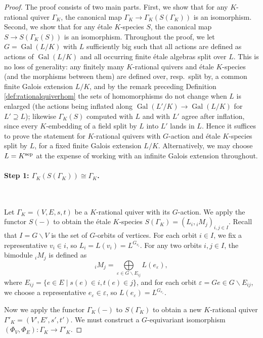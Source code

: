 \documentclass[a4paper,12pt,reqno]{amsart}
\DeclareMathOperator{\Gal}{\mathrm {Gal}}
\theoremstyle{plain}
\theoremstyle{remark}
\begin{document}
  \begin{proof}
    The proof consists of two main parts. First, we show that for any $K$-rational quiver $\Gamma_K$, the canonical map $\Gamma_K \to \Gamma_K(S(\Gamma_K))$ is an isomorphism. Second, we show that for any \'etale $K$-species $S$, the canonical map $S \to S(\Gamma_K(S))$ is an isomorphism. Throughout the proof, we let $G = \Gal(L/K)$ with $L$ sufficiently big such that all actions are defined as actions of $\Gal(L/K)$ and all occurring finite \'etale algebras split over $L$. This is no loss of generality: any finitely many $K$-rational quivers and \'etale $K$-species (and the morphisms between them) are defined over, resp.\ split by, a common finite Galois extension $L/K$, and by the remark preceding Definition \ref{def:rationalquiverhom} the sets of homomorphisms do not change when $L$ is enlarged (the actions being inflated along $\Gal(L'/K)\to\Gal(L/K)$ for $L'\supseteq L$); likewise $\Gamma_K(S)$ computed with $L$ and with $L'$ agree after inflation, since every $K$-embedding of a field split by $L$ into $L'$ lands in $L$. Hence it suffices to prove the statement for $K$-rational quivers with $G$-action and \'etale $K$-species split by $L$, for a fixed finite Galois extension $L/K$. Alternatively, we may choose $L=K^{\rm sep}$ at the expense of working with an infinite Galois extension throughout.

    \paragraph{Step 1: $\Gamma_K(S(\Gamma_K)) \cong \Gamma_K$.}\ 

    \smallskip
    Let $\Gamma_K = (V,E,s,t)$ be a $K$-rational quiver with its $G$-action. We apply the functor $S(-)$ to obtain the \'etale $K$-species $S(\Gamma_K) = (L_i, {}_iM_j)_{i,j \in I}$. Recall that $I=G\backslash V$ is the set of $G$-orbits of vertices. For each orbit $i\in I$, we fix a representative $v_i \in i$, so $L_i=L(v_i)=L^{G_{v_i}}$. For any two orbits $i,j \in I$, the bimodule ${}_iM_j$ is defined as
    \[
      {}_iM_j = \bigoplus\limits_{\varepsilon \in G\backslash E_{ij}} L(e_\varepsilon),
    \]
    where $E_{ij}=\{e\in E \mid s(e)\in i, t(e)\in j\}$, and for each orbit $\varepsilon=Ge \in G\backslash E_{ij}$, we choose a representative $e_\varepsilon \in \varepsilon$, so $L(e_\varepsilon) = L^{G_{e_\varepsilon}}$.

    Now we apply the functor $\Gamma_K(-)$ to $S(\Gamma_K)$ to obtain a new $K$-rational quiver $\Gamma'_K = (V',E',s',t')$. We must construct a $G$-equivariant isomorphism $(\Phi_V, \Phi_E): \Gamma_K \to \Gamma'_K$.


\end{proof}
\end{document}
